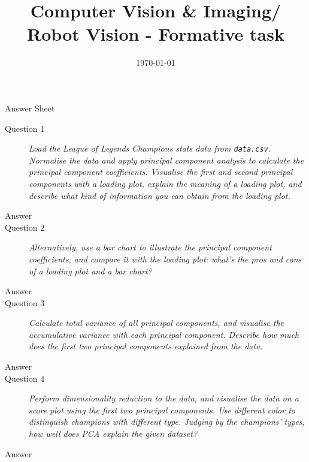 \documentclass[a4paper, oneside]{article}
\begin{document}
	\title{Computer Vision \& Imaging/ Robot Vision - Formative task}
	\date{\today}
	
	\maketitle
    \begin{center}
        \Large
        Answer Sheet
    \end{center}
    \begin{description}
    	\item[Question 1] \emph{Load the League of Legends Champions stats data from \texttt{data.csv}. Normalise the data and apply principal component analysis to calculate the principal component coefficients. Visualise the first and second principal components with a loading plot, explain the meaning of a loading plot, and describe what kind of information you can obtain from the loading plot.}
    	\item[Answer]
    	\item[Question 2] \emph{Alternatively, use a bar chart to illustrate the principal component coefficients, and compare it with the loading plot: what's the pros and cons of a loading plot and a bar chart?}
    	\item[Answer]
    	\item[Question 3] \emph{Calculate total variance of all principal components, and visualise the accumulative variance with each principal component. Describe how much does the first two principal components explained from the data.}
    	\item[Answer]
    	\item[Question 4] \emph{Perform dimensionality reduction to the data, and visualise the data on a score plot using the first two principal components. Use different color to distinguish champions with different type. Judging by the champions' types, how well does PCA explain the given dataset?}
    	\item[Answer]
	\end{description}
\end{document}
